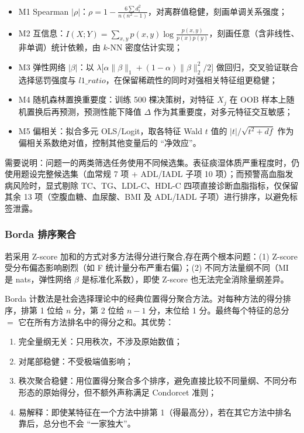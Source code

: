 \documentclass{MathorCupmodeling}
\providecommand{\tightlist}{%
  \setlength{\itemsep}{0pt}\setlength{\parskip}{0pt}}
\begin{document}
\begin{itemize}
\tightlist
\item M1 Spearman $|\rho|$：$\rho = 1 - \frac{6\sum d_i^2}{n(n^2-1)}$，对离群值稳健，刻画单调关系强度；
\item M2 互信息：$I(X; Y) = \sum_{x,y} p(x,y) \log \frac{p(x,y)}{p(x)p(y)}$，刻画任意（含非线性、非单调）统计依赖，由 $k$-NN 密度估计实现；
\item M3 弹性网络 $|\beta|$：以 $\lambda\bigl[\alpha\|\beta\|_1 + (1-\alpha)\|\beta\|_2^2/2\bigr]$ 做回归，交叉验证联合选择惩罚强度与 $l1\_ratio$，在保留稀疏性的同时对强相关特征组更稳健；
\item M4 随机森林置换重要度：训练 500 棵决策树，对特征 $X_j$ 在 OOB 样本上随机置换后再预测，预测性能下降值 $\Delta$ 作为其重要度，对多元特征交互敏感；
\item M5 偏相关：拟合多元 OLS/Logit，取各特征 Wald $t$ 值的 $|t|/\sqrt{t^2 + df}$ 作为偏相关系数绝对值，控制其他变量后的 ``净效应''。
\end{itemize}

需要说明：问题一的两类筛选任务使用不同候选集。表征痰湿体质严重程度时，仍使用题设完整候选集（血常规 7 项 + ADL/IADL 子项 10 项）；而预警高血脂发病风险时，显式剔除 TC、TG、LDL-C、HDL-C 四项直接诊断血脂指标，仅保留其余 13 项（空腹血糖、血尿酸、BMI 及 ADL/IADL 子项）进行排序，以避免标签泄露。

\subsubsection{Borda 排序聚合}

若采用 Z-score 加和的方式对多方法得分进行聚合,存在两个根本问题：(1) Z-score 受分布偏态影响剧烈（如 F 统计量分布严重右偏）；(2) 不同方法量纲不同（MI 是 nats，弹性网络 $\beta$ 是标准化系数），即使 Z-score 也无法完全消除量纲差异。

Borda 计数法\cite{saari1995borda}是社会选择理论中的经典位置得分聚合方法。对每种方法的得分排序，排第 1 位给 $n$ 分，第 2 位给 $n-1$ 分，末位给 1 分。最终每个特征的总分 $=$ 它在所有方法排名中的得分之和。其优势：

\begin{enumerate}
\def\labelenumi{(\arabic{enumi})}
\tightlist
\item 完全量纲无关：只用秩次，不涉及原始数值；
\item 对尾部稳健：不受极端值影响；
\item 秩次聚合稳健：用位置得分聚合多个排序，避免直接比较不同量纲、不同分布形态的原始得分，但不额外声称满足 Condorcet 准则；
\item 易解释：即使某特征在一个方法中排第 1（得最高分），若在其它方法中排名靠后，总分也不会 ``一家独大''。
\end{enumerate}
\end{document}
